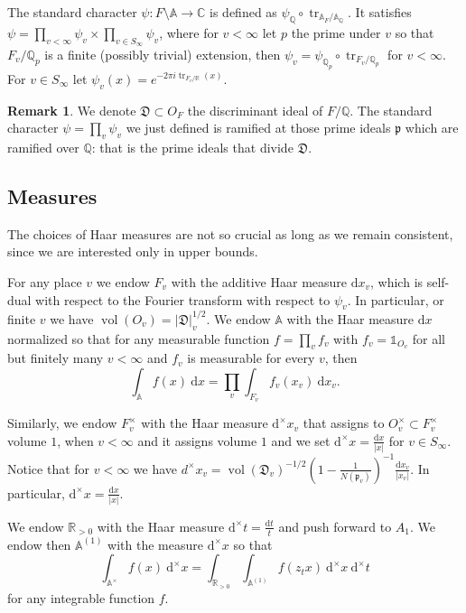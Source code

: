 \documentclass[a4paper,11pt]{amsart}
\theoremstyle{definition}
\newtheorem{remark}[theorem]{Remark}
\newcommand{\A}{\mathbb{A}}
\newcommand{\R}{\mathbb{R}}
\newcommand{\Q}{\mathbb{Q}}
\newcommand{\CC}{\mathbb{C}}
\begin{document}
The standard character $\psi \colon F\setminus\A \to \CC$ is defined as $\psi_{\Q}\circ \operatorname{tr}_{\A_F/\A_\Q}$. It satisfies $\psi = \prod_{v<\infty} \psi_v \times \prod_{v\in S_{\infty}}\psi_v$, where for $v< \infty$ let $p$ the prime under $v$ so that $F_v/\Q_p$ is a finite (possibly trivial) extension, then $\psi_v = \psi_{\Q_p}\circ \operatorname{tr}_{F_v/\Q_p}$ for $v< \infty$. For $v\in S_{\infty}$ let $\psi_v(x) = e^{-2\pi i\operatorname{tr}_{F_v/\R}(x)}.$   

\begin{remark}  We denote $\mathfrak{D}\subset O_F$ the discriminant ideal of $F/\Q$.
The standard character $\psi = \prod_{v}\psi_v$ we just defined is ramified at those prime ideals $\mathfrak{p}$ which are ramified over $\Q$: that is the prime ideals that divide $\mathfrak{D}$.
\end{remark}

\subsection{Measures}
The choices of Haar measures are not so crucial as long as we remain consistent, since we are interested only in upper bounds.  

For any place $v$ we endow $F_v$ with the additive Haar measure $\mathrm{d}x_v$, which is self-dual with respect to the Fourier transform with respect to $\psi_v$. In particular, or finite $v$ we have $\operatorname{vol}(O_v) = \vert{\mathfrak{D}}\vert_v^{1/2}$.
We endow $\A$ with the Haar measure $\mathrm{d}x$ normalized so that for any measurable function $f = \prod_{v}f_v$ with $f_v = \mathbb{1}_{O_v}$ for all but finitely many $v< \infty$ and $f_v$ is measurable for every $v$, then 
\[\int_\A f(x)\ \mathrm{d}x = \prod_{v}\int_{F_v}f_v(x_v)\ \mathrm{d}x_v.\]

Similarly, we endow $F_v^{\times}$ with the Haar measure $\mathrm{d}^{\times}x_v$ that assigns to $O_v^{\times} \subset F_v^{\times}$ volume $1$, when $v<\infty$ and it assigns volume $1$ and we set $\mathrm{d}^\times x=\frac{\mathrm{d}x}{\vert{x}\vert}$ for $v\in S_{\infty}$. Notice that for $v<\infty$ we have $d^{\times}x_v = \operatorname{vol}(\mathfrak{D}_v)^{-1/2}(1-\frac{1}{N(\mathfrak{p}_v)})^{-1}\frac{\mathrm{d}x_v}{\vert{x}_v\vert}.$ In particular, $\mathrm{d}^{\times} x = \frac{\mathrm{d}x}{\vert{x}\vert}$. 

We endow $\R_{>0}$ with the Haar measure $\mathrm{d}^{\times }t= \frac{\mathrm{d}t}{t}$ and push forward to $A_1$. We endow then $\A^{(1)}$ with the measure $\mathrm{d}^\times x$ so that \[\int_{\A^{\times}}f(x)\ \mathrm{d}^{\times}x= \int_{\R_{>0}}\int_{\A^{(1)}}f(z_tx)\ \mathrm{d}^{\times}x\ \mathrm{d}^\times t\]
for any integrable function $f$. 
\end{document}
